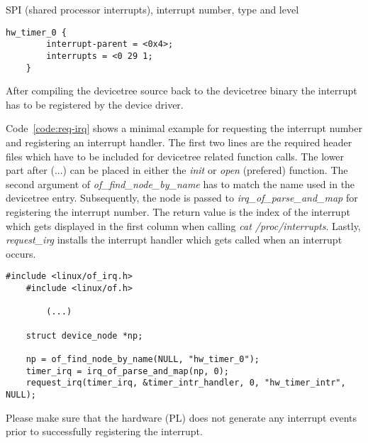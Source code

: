 SPI (shared processor interrupts), interrupt number, type and level
\begin{lstlisting}[label=code:devicetree-binding]
    hw_timer_0 {
        interrupt-parent = <0x4>;
        interrupts = <0 29 1;
    }
\end{lstlisting}

After compiling the devicetree source back to the devicetree binary the interrupt has to be registered by the device driver.

Code~\ref{code:req-irq} shows a minimal example for requesting the interrupt number and registering an interrupt handler.
The first two lines are the required header files which have to be included for devicetree related function calls.
The lower part after (...) can be placed in either the \emph{init} or \emph{open} (prefered) function.
The second argument of \emph{of\_find\_node\_by\_name} has to match the name used in the devicetree entry.
Subsequently, the node is passed to \emph{irq\_of\_parse\_and\_map} for registering the interrupt number.
The return value is the index of the interrupt which gets displayed in the first column when calling \emph{cat /proc/interrupts}.
Lastly, \emph{request\_irg} installs the interrupt handler which gets called when an interrupt occurs.

\begin{lstlisting}[label=code:req-irq]
    #include <linux/of_irq.h>
    #include <linux/of.h>

        (...)

    struct device_node *np;

    np = of_find_node_by_name(NULL, "hw_timer_0");
    timer_irq = irq_of_parse_and_map(np, 0);
    request_irq(timer_irq, &timer_intr_handler, 0, "hw_timer_intr", NULL);
\end{lstlisting}

Please make sure that the hardware (PL) does not generate any interrupt events prior to successfully registering the interrupt.
